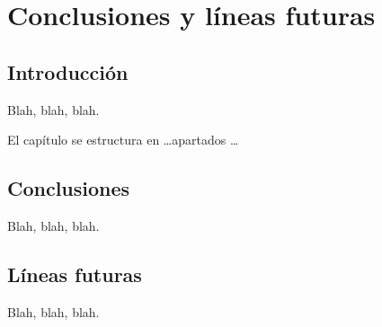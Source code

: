 %

\chapter{Conclusiones y líneas futuras}
\label{cha:concl-y-line}


\section{Introducción}
\label{sec:introduccion-conclusiones}

Blah, blah, blah.

El capítulo se estructura en \ldots apartados \ldots



\section{Conclusiones}
\label{sec:conclusions}

Blah, blah, blah.



\section{Líneas futuras}
\label{sec:lineas-futuras}

Blah, blah, blah.




